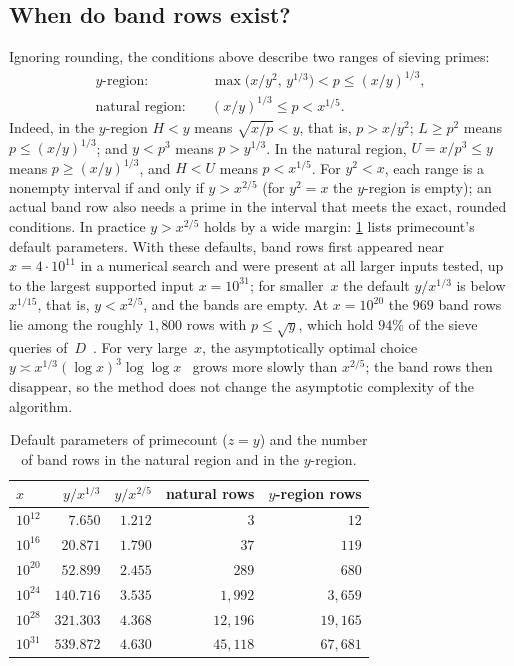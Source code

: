 \documentclass[11pt,a4paper]{amsart}
\numberwithin{equation}{section}
\begin{document}
\subsection{When do band rows exist?}
Ignoring rounding, the conditions above describe two ranges of sieving primes:
\begin{align*}
  \text{$y$-region:}&\quad \max\bigl(x/y^2,\,y^{1/3}\bigr)<p\le(x/y)^{1/3},\\
  \text{natural region:}&\quad (x/y)^{1/3}\le p<x^{1/5}.
\end{align*}
Indeed, in the $y$-region $H<y$ means $\sqrt{x/p}<y$, that is, $p>x/y^2$;
$L\ge p^2$ means $p\le(x/y)^{1/3}$; and $y<p^3$ means $p>y^{1/3}$. In the natural
region, $U=x/p^3\le y$ means $p\ge(x/y)^{1/3}$, and $H<U$ means $p<x^{1/5}$.
For $y^2<x$, each range is a nonempty interval if and only if $y>x^{2/5}$ (for
$y^2=x$ the $y$-region is empty); an
actual band row also needs a prime in the interval that meets the exact, rounded
conditions. In practice $y>x^{2/5}$ holds by a wide margin: \cref{tab:defaults}
lists primecount's default parameters. With these defaults, band rows first
appeared near $x=4\cdot10^{11}$ in a numerical search and were present at all
larger inputs tested, up to the largest supported input $x=10^{31}$; for
smaller~$x$ the default $y/x^{1/3}$ is below $x^{1/15}$, that
is, $y<x^{2/5}$, and the bands are empty. At $x=10^{20}$ the $969$ band rows lie among the roughly
$1{,}800$ rows with $p\le\sqrt y$, which hold $94\%$ of the sieve queries
of~$D$~\cite[\S6]{Lin2026}. For very large~$x$, the asymptotically optimal
choice $y\asymp x^{1/3}(\log x)^3\log\log x$~\cite[\S2]{Gourdon2001} grows more
slowly than $x^{2/5}$; the band rows then disappear, so the method does not
change the asymptotic complexity of the algorithm.

\begin{table}[htb]
\caption{Default parameters of primecount ($z=y$) and the number of band rows in
the natural region and in the $y$-region.}\label{tab:defaults}
\centering
\begin{tabular}{@{}lrrrr@{}}
\toprule
$x$ & $y/x^{1/3}$ & $y/x^{2/5}$ & natural rows & $y$-region rows\\
\midrule
$10^{12}$ & $7.650$ & $1.212$ & $3$ & $12$\\
$10^{16}$ & $20.871$ & $1.790$ & $37$ & $119$\\
$10^{20}$ & $52.899$ & $2.455$ & $289$ & $680$\\
$10^{24}$ & $140.716$ & $3.535$ & $1{,}992$ & $3{,}659$\\
$10^{28}$ & $321.303$ & $4.368$ & $12{,}196$ & $19{,}165$\\
$10^{31}$ & $539.872$ & $4.630$ & $45{,}118$ & $67{,}681$\\
\bottomrule
\end{tabular}
\end{table}
\end{document}
